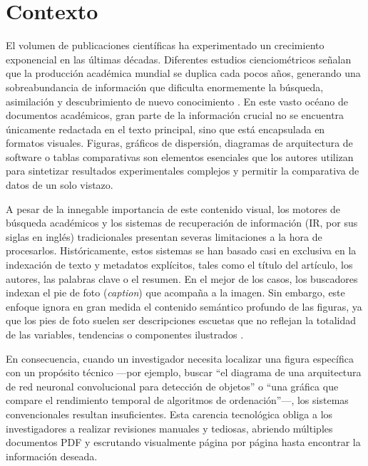 \documentclass[a4paper]{report}
\begin{document}
\section{Contexto}

El volumen de publicaciones científicas ha experimentado un crecimiento exponencial en las últimas décadas. Diferentes estudios cienciométricos señalan que la producción académica mundial se duplica cada pocos años, generando una sobreabundancia de información que dificulta enormemente la búsqueda, asimilación y descubrimiento de nuevo conocimiento \cite{bornmann2015}. En este vasto océano de documentos académicos, gran parte de la información crucial no se encuentra únicamente redactada en el texto principal, sino que está encapsulada en formatos visuales. Figuras, gráficos de dispersión, diagramas de arquitectura de software o tablas comparativas son elementos esenciales que los autores utilizan para sintetizar resultados experimentales complejos y permitir la comparativa de datos de un solo vistazo.

A pesar de la innegable importancia de este contenido visual, los motores de búsqueda académicos y los sistemas de recuperación de información (IR, por sus siglas en inglés) tradicionales presentan severas limitaciones a la hora de procesarlos. Históricamente, estos sistemas se han basado casi en exclusiva en la indexación de texto y metadatos explícitos, tales como el título del artículo, los autores, las palabras clave o el resumen. En el mejor de los casos, los buscadores indexan el pie de foto (\textit{caption}) que acompaña a la imagen. Sin embargo, este enfoque ignora en gran medida el contenido semántico profundo de las figuras, ya que los pies de foto suelen ser descripciones escuetas que no reflejan la totalidad de las variables, tendencias o componentes ilustrados \cite{zhong2019}. 

En consecuencia, cuando un investigador necesita localizar una figura específica con un propósito técnico —por ejemplo, buscar ``el diagrama de una arquitectura de red neuronal convolucional para detección de objetos'' o ``una gráfica que compare el rendimiento temporal de algoritmos de ordenación''—, los sistemas convencionales resultan insuficientes. Esta carencia tecnológica obliga a los investigadores a realizar revisiones manuales y tediosas, abriendo múltiples documentos PDF y escrutando visualmente página por página hasta encontrar la información deseada.
\end{document}
